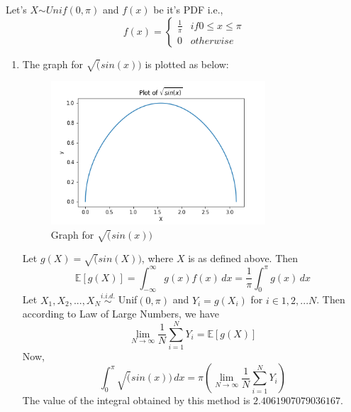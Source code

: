 \documentclass{article}
\begin{document}
\begin{enumerate}
	\noindent %
    Let's $X \stackrel{}{\sim} Unif(0, \pi)$ and $f(x)$ be it's PDF i.e.,
    \begin{equation}
    \nonumber
    f(x) = \begin{cases}
        \frac{1}{\pi} & if 0 \le x \le \pi \\
        0 & otherwise
    \end{cases}
    \end{equation} 
        \begin{enumerate}
            \item The graph for $\sqrt(sin(x))$ is plotted as below:
                \begin{figure}[H]
                    \begin{center}
                    \includegraphics[width=8cm]{Q3_1.png}
                    \end{center}
                    \caption{Graph for $\sqrt(sin(x))$}
                \end{figure}
                Let $g(X) = \sqrt(sin(X))$, where $X$ is as defined above. Then 
                \begin{equation}
                    \mathbb{E}[g(X)] = \int_{-\infty}^{\infty}g(x)f(x) \,dx =  \frac{1}{\pi}\int_{0}^{\pi}g(x) \,dx
                \end{equation}
                Let $X_{1}, X_{2}, ..., X_{N} \stackrel{i.i.d.}{\sim}$ Unif$(0, \pi)$ and $Y_{i} = g(X_{i})$ for $i \in {1, 2, ... N}$. 
                Then according to Law of Large Numbers, we have 
                \begin{equation}
                    \nonumber
                    \lim_{N\to\infty} \frac{1}{N}\sum_{i=1}^{N}Y_{i} = \mathbb{E}[g(X)]
                \end{equation}
                Now,
                \begin{equation}
                    \int_{0}^{\pi}\sqrt(sin(x)) \,dx =  \pi \left ( \lim_{N\to\infty} \frac{1}{N}\sum_{i=1}^{N}Y_{i} \right )
                \end{equation}
                The value of the integral obtained by this method is $2.4061907079036167$.


\end{enumerate}
\end{enumerate}
\end{document}
